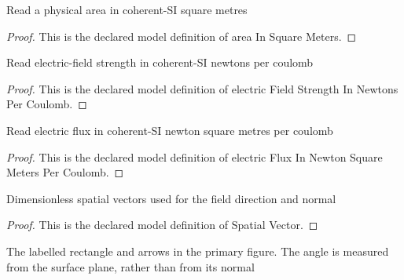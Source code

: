 \begin{definition}
  \label{def:physics:phyx-mini-0845:phyxminiproblems-problemphyxmini0845-areainsquaremeters}
  Read a physical area in coherent-SI square metres
\end{definition}
\begin{proof}
  This is the declared model definition of area In Square Meters.
\end{proof}
\begin{definition}
  \label{def:physics:phyx-mini-0845:phyxminiproblems-problemphyxmini0845-electricfieldstrengthinnewtonspercoulomb}
  Read electric-field strength in coherent-SI newtons per coulomb
\end{definition}
\begin{proof}
  This is the declared model definition of electric Field Strength In Newtons Per Coulomb.
\end{proof}
\begin{definition}
  \label{def:physics:phyx-mini-0845:phyxminiproblems-problemphyxmini0845-electricfluxinnewtonsquaremeterspercoulomb}
  Read electric flux in coherent-SI newton square metres per coulomb
\end{definition}
\begin{proof}
  This is the declared model definition of electric Flux In Newton Square Meters Per Coulomb.
\end{proof}
\begin{definition}
  \label{def:physics:phyx-mini-0845:phyxminiproblems-problemphyxmini0845-spatialvector}
  Dimensionless spatial vectors used for the field direction and normal
\end{definition}
\begin{proof}
  This is the declared model definition of Spatial Vector.
\end{proof}
\begin{definition}
  \label{def:physics:phyx-mini-0845:phyxminiproblems-problemphyxmini0845-rectangularplanefigure}
  The labelled rectangle and arrows in the primary figure. The angle is measured from the surface plane, rather than from its normal
\end{definition}
